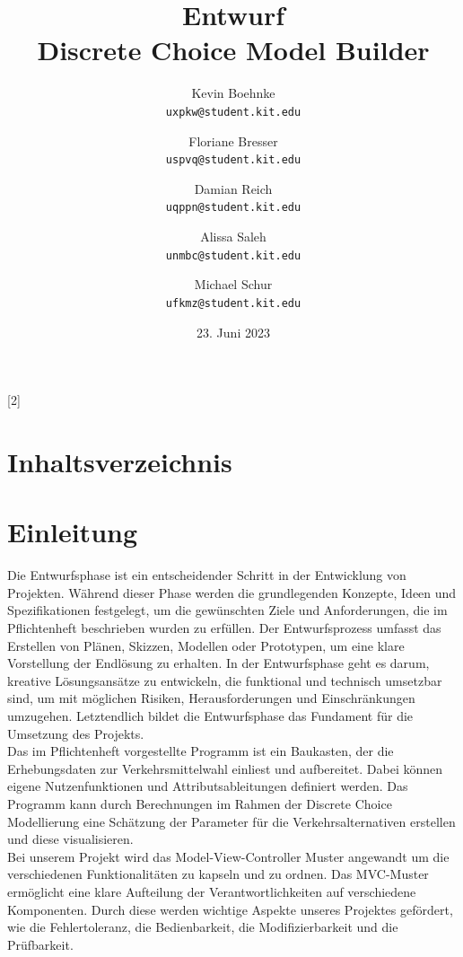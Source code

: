 \documentclass{article}
\title{Entwurf \\ \large Discrete Choice Model Builder}
\author{Kevin Boehnke \\ \texttt{uxpkw@student.kit.edu}
\and Floriane Bresser \\ \texttt{uspvq@student.kit.edu}
\and Damian Reich \\ \texttt{uqppn@student.kit.edu}
\and Alissa Saleh \\ \texttt{unmbc@student.kit.edu}
\and Michael Schur \\ \texttt{ufkmz@student.kit.edu}}
\date{23. Juni 2023}
\begin{document}
\maketitle
\newpage
\startcontents[maintableofcontents]
[2]{\section*{Inhaltsverzeichnis}}
\thispagestyle{empty}
\newpage
{}

\section{Einleitung}
Die Entwurfsphase ist ein entscheidender Schritt in der Entwicklung von Projekten. Während dieser Phase werden die grundlegenden Konzepte, Ideen und Spezifikationen festgelegt, um die gewünschten Ziele und Anforderungen, die im Pflichtenheft beschrieben wurden zu erfüllen. Der Entwurfsprozess umfasst das Erstellen von Plänen, Skizzen, Modellen oder Prototypen, um eine klare Vorstellung der Endlösung zu erhalten.
In der Entwurfsphase geht es darum, kreative Lösungsansätze zu entwickeln, die funktional und technisch umsetzbar sind, um mit möglichen Risiken, Herausforderungen und Einschränkungen umzugehen.
Letztendlich bildet die Entwurfsphase das Fundament für die Umsetzung des Projekts.\\

Das im Pflichtenheft vorgestellte Programm ist ein Baukasten, der die Erhebungsdaten zur Verkehrsmittelwahl einliest und aufbereitet. Dabei können eigene Nutzenfunktionen und Attributsableitungen definiert werden. Das Programm kann durch Berechnungen im Rahmen der Discrete Choice Modellierung eine Schätzung der Parameter für die Verkehrsalternativen erstellen und diese visualisieren.\\

Bei unserem Projekt wird das Model-View-Controller Muster angewandt um die verschiedenen Funktionalitäten zu kapseln und zu ordnen.
Das MVC-Muster ermöglicht eine klare Aufteilung der Verantwortlichkeiten auf verschiedene Komponenten.
Durch diese werden wichtige Aspekte unseres Projektes gefördert, wie die Fehlertoleranz, die Bedienbarkeit, die Modifizierbarkeit und die Prüfbarkeit.
\end{document}
